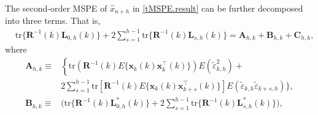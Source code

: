 \documentclass[ejsv2]{imsart}
\theoremstyle{plain}
\theoremstyle{definition}
\theoremstyle{remark}
\begin{document}
The second-order MSPE of $\hat{x}_{n+h}$ in \eqref{tMSPE.result} can be further decomposed into three terms. That is,
\begin{equation*}
\begin{split}
     & \mathrm{tr}\{\mathbf{R}^{-1}(k)\mathbf{L}_{0,h}(k)\}+2\sum_{s=1}^{h-1}\mathrm{tr}\{\mathbf{R}^{-1}(k)\mathbf{L}_{s,h}(k)\}=\bm{A}_{h, k}+\bm{B}_{h, k}+\bm{C}_{h, k},
\end{split}
\end{equation*}
where
\begin{equation*}
\begin{split}
   \bm{A}_{h, k}\equiv &
   \left\{
   \mathrm{tr}
   \left(\mathbf{R}^{-1}(k)
E\big\{\mathbf{x}_k(k)\mathbf{x}_{k}^\top(k)
\big\}
\right)E\left(\tilde{\varepsilon}_{k,h}^2\right)\right.+\\ &2\sum_{s=1}^{h-1}\mathrm{tr}[\mathbf{R}^{-1}(k)E\{\mathbf{x}_k(k)\mathbf{x}_{k+s}^\top(k)\}]
E(\tilde{\varepsilon}_{k,h}\tilde{\varepsilon}_{k+s,h})\big\}, \\
     \bm{B}_{h, k}\equiv& \Big(\mathrm{tr}\{\mathbf{R}^{-1}(k)\mathbf{L}^\ast_{0,h}(k)\}+2\sum_{s=1}^{h-1}\mathrm{tr}\{\mathbf{R}^{-1}(k)\mathbf{L}^\ast_{s,h}(k)\}\Big),
\end{split}
\end{equation*}
\end{document}
